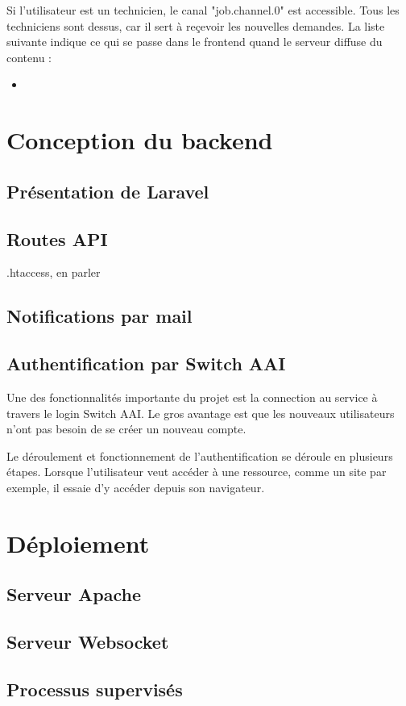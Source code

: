 \documentclass[
    iai, %
    eai, %
]{heig-tb}
\begin{document}
Si l'utilisateur est un technicien, le canal "job.channel.0" est accessible. Tous les techniciens sont dessus, car il sert à reçevoir les nouvelles demandes.
La liste suivante indique ce qui se passe dans le frontend quand le serveur diffuse du contenu :
\begin{itemize}
  \item 
\end{itemize}

\chapter{Conception du backend}
\section{Présentation de Laravel}
\section{Routes API}
.htaccess, en parler
\section{Notifications par mail}
\section{Authentification par Switch AAI}
Une des fonctionnalités importante du projet est la connection au service à travers le login Switch AAI.
Le gros avantage est que les nouveaux utilisateurs n'ont pas besoin de se créer un nouveau compte.

Le déroulement et fonctionnement de l'authentification se déroule en plusieurs étapes.
Lorsque l'utilisateur veut accéder à une ressource, comme un site par exemple, il essaie d'y accéder depuis son navigateur.



\chapter{Déploiement}
\section{Serveur Apache}
\section{Serveur Websocket}
\section{Processus supervisés}
\end{document}

